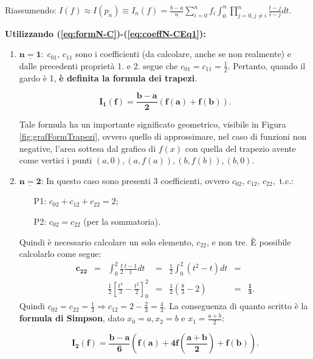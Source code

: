 Riassumendo: $I(f)\approx I(p_n)\equiv I_n(f)=\frac{b-a}{n}\sum_{i=0}^n f_i \int_0^n\prod_{j=0,j\neq i}^n\frac{t-j}{i-j}dt.$

\textbf{Utilizzando (\ref{eq:formN-C})-(\ref{eq:coeffN-CEq1}):}
\begin{enumerate}
    \item $\boldsymbol{\underline{n=1}}:\; c_{01},\, c_{11}$ sono i coefficienti (da calcolare, anche se non realmente) e dalle precedenti proprietà 1. e 2. segue che $c_{01}=c_{11}=\frac{1}{2}.$ Pertanto, quando il gardo è 1, \textbf{è definita la formula dei trapezi}.
   \begin{definition}
   	 \begin{equation}\label{eq:formula_trapezi}
       \boldsymbol{I_1(f)=\frac{b-a}{2}(f(a)+f(b))}.
    \end{equation}
   \end{definition}
    Tale formula ha un importante significato geometrico, visibile in Figura \ref{fig:grafFormTrapezi}, ovvero quello di approssimare, nel caso di funzioni non negative, l'area sottesa dal grafico di $f(x)$ con quella del trapezio avente come vertici i punti $(a,0),(a,f(a)),(b,f(b)),(b,0)$.
    \item $\boldsymbol{\underline{n=2}}$: In questo caso sono presenti 3 coefficienti, ovvero $c_{02},\, c_{12}, \,c_{22},$ t.c.:
    \begin{enumerate}
        \item[P1:] $c_{02}+c_{12}+c_{22}=2$;
        \item[P2:] $c_{02}=c_{22}$ (per la sommatoria).
    \end{enumerate}
    Quindi è necessario calcolare un solo elemento, $c_{22}$, e non tre. È possibile calcolarlo come segue:
    \begin{equation*}
        \begin{matrix}
            \boldsymbol{c_{22}}&=&\int_0^2\frac{t}{2}\frac{t-1}{1}dt&=&\frac{1}{2}\int_0^2(t^2-t)dt&=&\\
            &&\frac{1}{2}\left[\frac{t^3}{3}-\frac{t^2}{2}\right]_0^2&=&\frac{1}{2}\left(\frac{8}{3}-2\right)&=&\boldsymbol{\frac{1}{3}}.
        \end{matrix}
    \end{equation*}
    Quindi $c_{02}=c_{22}=\frac{1}{3}\Rightarrow c_{12}=2-\frac{2}{3}=\frac{4}{3}$.
    La conseguenza di quanto scritto è la \textbf{formula di Simpson}, dato $x_0=a, x_2=b$ e $x_1=\frac{a+b}{2}$:
	\begin{definition}
		    \begin{equation}\label{eq:formula_simpson}
	        \boldsymbol{I_2(f)=\frac{b-a}{6}\left(f(a)+4f\left(\frac{a+b}{2}\right)+f(b)\right)}.
	    \end{equation}
	\end{definition}
\end{enumerate}

